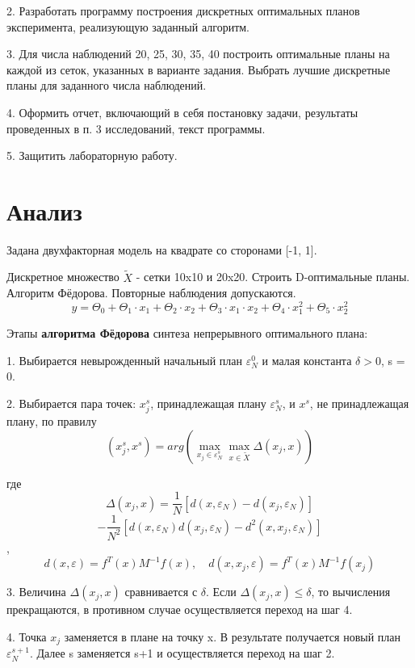 2.	Разработать программу построения дискретных оптимальных планов эксперимента, реализующую заданный алгоритм.  

3.	Для числа наблюдений 20, 25, 30, 35, 40 построить оптимальные планы на каждой из сеток, указанных в варианте задания. Выбрать лучшие дискретные планы для заданного числа наблюдений.  

4.	Оформить отчет, включающий в себя постановку задачи, результаты проведенных в п. 3 исследований, текст программы.  

5.	Защитить лабораторную работу.  



\section{Анализ}

Задана двухфакторная модель на квадрате со сторонами [-1, 1].

Дискретное множество $\tilde{X}$ - сетки 10x10 и 20x20. Строить D-оптимальные планы.
Алгоритм Фёдорова. Повторные наблюдения допускаются.
\[ y = \Theta_0 + \Theta_1 \cdot x_1 + \Theta_2 \cdot x_2 + \Theta_3 \cdot x_1 \cdot x_2 + \Theta_4 \cdot x_1^2 + \Theta_5 \cdot x_2^2 \]


Этапы {\bf алгоритма Фёдорова} синтеза непрерывного оптимального плана:

1. Выбирается невырожденный начальный план $\varepsilon^0_N$ и малая константа $\delta>0$, s = 0.

2. Выбирается пара точек: $x_j^s$, принадлежащая плану $\varepsilon^s_N$, и $x^s$, не принадлежащая плану, по правилу
\[ \left(x_j^s, x^s\right) = arg \left( \max_{x_j \in \varepsilon^s_N} \max_{x \in \tilde{X}} \Delta(x_j, x) \right) \]

где
\[ \Delta(x_j, x) = \frac{1}{N} \left[ d(x, \varepsilon_N) - d(x_j, \varepsilon_N) \right] \]
\[ - \frac{1}{N^2} \left[ d(x, \varepsilon_N) d(x_j, \varepsilon_N) - d^2 (x, x_j, \varepsilon_N) \right] \],
\[ d(x, \varepsilon) = f^T(x) M^{-1} f(x), \quad d(x,x_j, \varepsilon) = f^T(x) M^{-1} f(x_j) \]

3. Величина $\Delta(x_j, x)$ сравнивается с $\delta$. Если $\Delta(x_j, x) \le \delta$,
то вычисления прекращаются, в противном случае осуществляется переход на шаг 4.

4. Точка $x_j$ заменяется в плане на точку x. В результате получается новый план 
$\varepsilon_N^{s+1}$. Далее s  заменяется s+1 и осуществляется переход на шаг 2.

